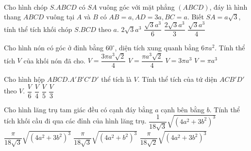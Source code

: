 \begin{ex}%
	Cho hình chóp $S. ABCD$ có $SA$ vuông góc với mặt phẳng $(ABCD) $, đáy là hình thang $ABCD$ vuông tại $A$ và $B$ có $AB=a, AD=3a, BC=a$. Biết $SA=a\sqrt{3}$, tính thể tích khối chóp $S. BCD$ theo $a$. 
	\choice
	{$2\sqrt{3}a^3$}
	{\True $\dfrac{\sqrt{3} a^3}{6}$}
	{$\dfrac{2\sqrt{3} a^3}{3} $}
	{$\dfrac{\sqrt{3} a^3}{4}$}
\end{ex}
\begin{ex}%
	Cho hình nón có góc ở đỉnh bằng $60^\circ $, diện tích xung quanh bằng $6\pi a^2$. Tính thể tích $V$ của khối nón đã cho.
	\choice
	{$V=\dfrac{3\pi a^3\sqrt{2}}{4}$}
	{$V=\dfrac{\pi a^3\sqrt{2}}{4}$}
	{\True $V=3\pi a^3$}
	{$V=\pi a^3$}
\end{ex}
\begin{ex}%
	Cho hình hộp $ABCD.A'B'C'D'$ thể tích là $V$. Tính thể tích của tứ diện $ACB'D'$ theo $V$.
	\choice
	{$\dfrac{V}{6}$}
	{$\dfrac{V}{4}$}
	{$\dfrac{V}{5}$}
	{\True $\dfrac{V}{3}$}
\end{ex}
\begin{ex}%
	Cho hình lăng trụ tam giác đều có cạnh đáy bằng $a$ cạnh bên bằng $b$. Tính thể tích khối cầu đi qua các đỉnh của hình lăng trụ. 
	\choice
	{$\dfrac{1}{18\sqrt{3}} \sqrt{\left (4a^2+3b^2\right) ^3}$}
	{\True $\dfrac{\pi}{18\sqrt{3}} \sqrt{\left (4a^2+3b^2\right) ^3}$}
	{$\dfrac{\pi}{18\sqrt{3}} \sqrt{\left (4a^2+b^2\right) ^3}$}
	{$\dfrac{\pi}{18\sqrt{2}} \sqrt{\left (4a^2+3b^2\right) ^3}$}
\end{ex}

